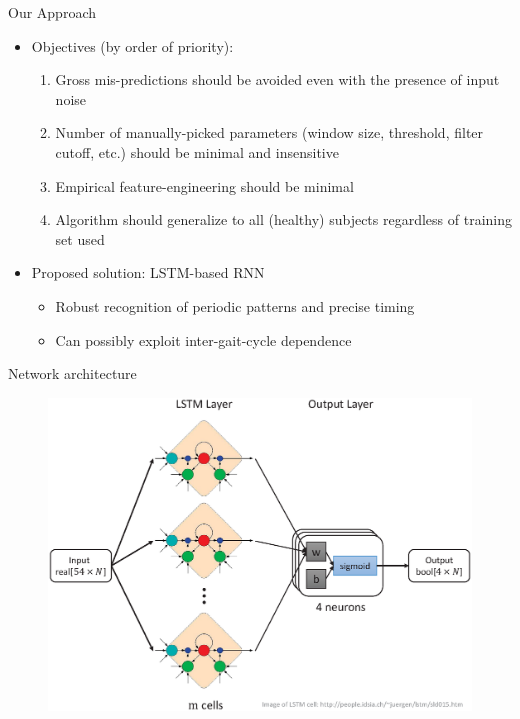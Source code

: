 \documentclass{beamer}
\begin{document}
\begin{frame}{Our Approach}
    \begin{itemize}
        \item Objectives (by order of priority):
        \begin{enumerate}
            \item Gross mis-predictions should be avoided even with the presence of input noise
            \item Number of manually-picked parameters (window size, threshold, filter cutoff, etc.) should be minimal and insensitive
            \item Empirical feature-engineering should be minimal
            \item Algorithm should generalize to all (healthy) subjects regardless of training set used
        \end{enumerate}
        \item Proposed solution: LSTM-based RNN
        \begin{itemize}
            \item Robust recognition of periodic patterns and precise timing
            \item Can possibly exploit inter-gait-cycle dependence
        \end{itemize}
    \end{itemize}
\end{frame}

\begin{frame}{Network architecture}
    \begin{figure}[H]
        \begin{center}
        \includegraphics[height=.77\textheight]{figures/network.eps} \\
        \end{center}
    \end{figure}
\end{frame}
\end{document}
